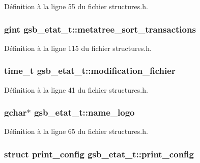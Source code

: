 Définition à la ligne 55 du fichier structures.h.

\subsubsection[{metatree\_\-sort\_\-transactions}]{\setlength{\rightskip}{0pt plus 5cm}gint {\bf gsb\_\-etat\_\-t::metatree\_\-sort\_\-transactions}}\label{structgsb__etat__t_aab3a9a46a988630eff0a8d7a0b9a80e8}


Définition à la ligne 115 du fichier structures.h.

\subsubsection[{modification\_\-fichier}]{\setlength{\rightskip}{0pt plus 5cm}time\_\-t {\bf gsb\_\-etat\_\-t::modification\_\-fichier}}\label{structgsb__etat__t_a9d0fa9057da603e64a601d69d7bf2b51}


Définition à la ligne 41 du fichier structures.h.

\subsubsection[{name\_\-logo}]{\setlength{\rightskip}{0pt plus 5cm}gchar$\ast$ {\bf gsb\_\-etat\_\-t::name\_\-logo}}\label{structgsb__etat__t_a1c4f0ecde430510ed3cf0c68491268b1}


Définition à la ligne 65 du fichier structures.h.

\subsubsection[{print\_\-config}]{\setlength{\rightskip}{0pt plus 5cm}struct {\bf print\_\-config} {\bf gsb\_\-etat\_\-t::print\_\-config}}\label{structgsb__etat__t_a7b6f0c9099af0a446bbbbc0205c4b3f6}


